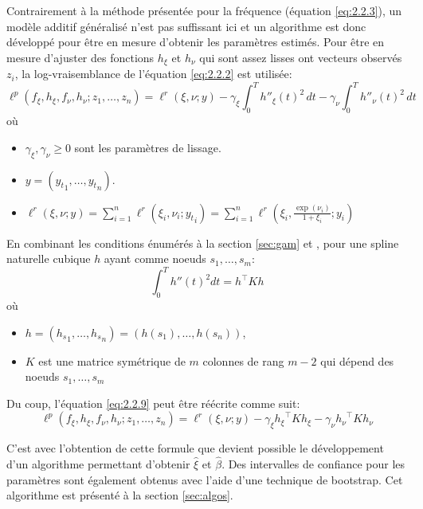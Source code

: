 Contrairement à la méthode présentée pour la fréquence (équation \ref{eq:2.2.3}), un modèle additif généralisé n'est pas suffissant ici et un algorithme est donc développé pour être en mesure d'obtenir les paramètres estimés. Pour être en mesure d'ajuster des fonctions $h_\xi$ et $h_\nu$ qui sont assez lisses ont vecteurs observés $z_i$, la log-vraisemblance de l'équation \ref{eq:2.2.2} est utilisée:
 \begin{equation}\label{eq:2.2.9}
\ell^p({f}_\xi, {h}_\xi, {f}_\nu, {h}_\nu; z_1, \dots, z_n) =  \ell^r(\xi, \nu; y) - \gamma_\xi \int_{0}^{T} h''_\xi(t)^2 \,dt - \gamma_\nu\int_{0}^{T}  h''_\nu(t)^2 \,dt 
\end{equation}
où 
\begin{itemize}
\item $ \gamma_\xi,  \gamma_\nu \geq 0$ sont les paramètres de lissage. 
\item $y=({y_t}_{1}, \dots, {y_t}_{n})$.
\item $\ell^r(\xi, \nu; y) = \sum_{i=1}^{n} \ell^r(\xi_i, \nu_i; {y_t}_{i}) = \sum_{i=1}^{n} \ell^r(\xi_i,\frac{\exp(\nu_i)}{1+\xi_i} ; y_i)$
\end{itemize}


En combinant les conditions énumérés à la section \ref{sec:gam} et \cite[p.~13]{green1993nonparametric}, pour une spline naturelle cubique $h$ ayant comme noeuds $s_1, \dots, s_m$:
\begin{equation}\label{eq:2.2.10}
\int_{0}^{T} h''(t)^2dt = h^{\top} K h
\end{equation}
où 
\begin{itemize}
\item $h=({h_s}_1, \dots, {h_s}_n) = (h(s_1), \dots, h(s_n))$,
\item $K$ est une matrice symétrique de $m$ colonnes de rang $m-2$ qui dépend des noeuds $s_1, \dots, s_m$
\end{itemize}

Du coup, l'équation \ref{eq:2.2.9} peut être réécrite comme suit:
\begin{equation}\label{eq:2.2.10}
\ell^p({f}_\xi, {h}_\xi, {f}_\nu, {h}_\nu; z_1, \dots, z_n) =  \ell^r(\xi, \nu; y) - \gamma_\xi  {h_\xi}^{\top} K {h_\xi} - \gamma_\nu  {h_\nu}^{\top} K {h_\nu}
\end{equation}

C'est avec l'obtention de cette formule que devient possible le développement d'un algorithme permettant d'obtenir $\hat\xi$ et $\hat\beta$.  Des intervalles de confiance pour les paramètres sont également obtenus avec l'aide d'une technique de bootstrap. Cet algorithme est présenté à la section \ref{sec:algos}. 
\\

